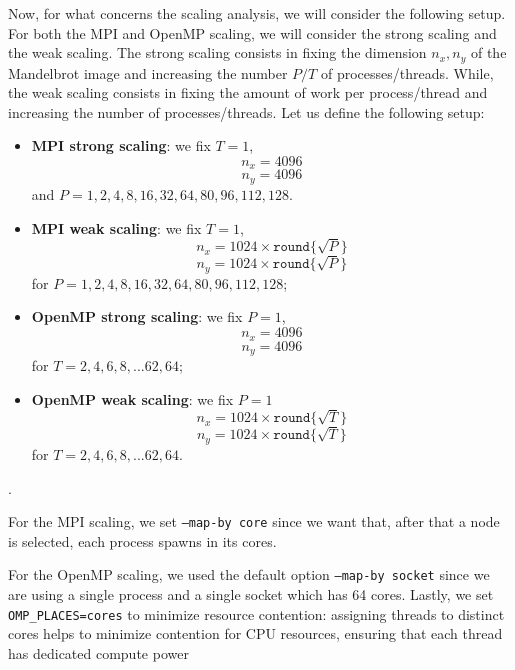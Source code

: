 Now, for what concerns the scaling analysis, we will consider the following setup. For both the MPI and OpenMP scaling, we will consider the strong scaling and the weak scaling. The strong scaling consists in fixing the dimension $n_x, n_y$ of the Mandelbrot image and increasing the number $P/T$ of processes/threads. While, the weak scaling consists in fixing the amount of work per process/thread and increasing the number of processes/threads.
Let us define the following setup:
\begin{itemize}
    \item \textbf{MPI strong scaling}: we fix $T=1$,
        $$n_x = 4096$$
        $$n_y = 4096$$
    and $P = 1, 2, 4, 8, 16, 32, 64, 80, 96, 112, 128$.
    \item \textbf{MPI weak scaling}: we fix $T=1$, 
        $$n_x = 1024 \times \texttt{round} \{\sqrt{P}\}$$
        $$n_y = 1024 \times \texttt{round}\{\sqrt{P}\}$$
    for $P = 1, 2, 4, 8, 16, 32, 64, 80, 96, 112, 128$;
    \item \textbf{OpenMP strong scaling}: we fix $P=1$,
        $$n_x = 4096$$
        $$n_y = 4096$$
    for $T = 2, 4, 6, 8, ... 62, 64$;
    \item \textbf{OpenMP weak scaling}: we fix $P=1$
        $$n_x = 1024 \times \texttt{round}\{\sqrt{T}\}$$
        $$n_y = 1024 \times \texttt{round}\{\sqrt{T}\}$$
    for $T = 2, 4, 6, 8, ... 62, 64$.
\end{itemize}.

For the MPI scaling, we set \texttt{--map-by core} since we want that, after that a node is selected, each process spawns in its cores.

For the OpenMP scaling, we used the default option \texttt{--map-by socket} since we are using a single process and a single socket which has 64 cores. Lastly, we set \texttt{OMP\_PLACES=cores} to minimize resource contention: assigning threads to distinct cores helps to minimize contention for CPU resources, ensuring that each thread has dedicated compute power
